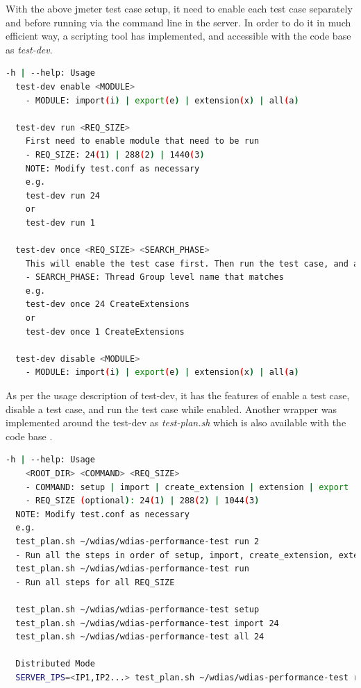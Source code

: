 With the above \acrshort{jmeter} test case setup, it need to enable each test case separately and before running via the command line in the server. In order to do it in much efficient way, a scripting tool has implemented, and accessible with the code base \cite{KarunarathneWdias-performance-test/TEST_PLAN.md:Plan} as \emph{test-dev}.

\begin{lstlisting}[language=sh, caption=Performance Test Help]
-h | --help: Usage
  test-dev enable <MODULE>
    - MODULE: import(i) | export(e) | extension(x) | all(a)

  test-dev run <REQ_SIZE>
    First need to enable module that need to be run
    - REQ_SIZE: 24(1) | 288(2) | 1440(3)
    NOTE: Modify test.conf as necessary
    e.g.
    test-dev run 24
    or
    test-dev run 1

  test-dev once <REQ_SIZE> <SEARCH_PHASE>
    This will enable the test case first. Then run the test case, and at the end disable and exit.
    - SEARCH_PHASE: Thread Group level name that matches
    e.g.
    test-dev once 24 CreateExtensions
    or
    test-dev once 1 CreateExtensions

  test-dev disable <MODULE>
    - MODULE: import(i) | export(e) | extension(x) | all(a)
\end{lstlisting}

As per the usage description of test-dev, it has the features of enable a test case, disable a test case, and run the test case while enabled.
Another wrapper was implemented around the test-dev as \emph{test-plan.sh} which is also available with the code base \cite{KarunarathneWdias-performance-test/TEST_PLAN.md:Plan}.

\begin{lstlisting}[language=sh, caption=Test Plan Help]
-h | --help: Usage
    <ROOT_DIR> <COMMAND> <REQ_SIZE>
    - COMMAND: setup | import | create_extension | extension | export | all | query
    - REQ_SIZE (optional): 24(1) | 288(2) | 1044(3)
  NOTE: Modify test.conf as necessary
  e.g.
  test_plan.sh ~/wdias/wdias-performance-test run 2
  - Run all the steps in order of setup, import, create_extension, extension, export, all, query
  test_plan.sh ~/wdias/wdias-performance-test run
  - Run all steps for all REQ_SIZE

  test_plan.sh ~/wdias/wdias-performance-test setup
  test_plan.sh ~/wdias/wdias-performance-test import 24
  test_plan.sh ~/wdias/wdias-performance-test all 24

  Distributed Mode
  SERVER_IPS=<IP1,IP2...> test_plan.sh ~/wdias/wdias-performance-test run
\end{lstlisting}

